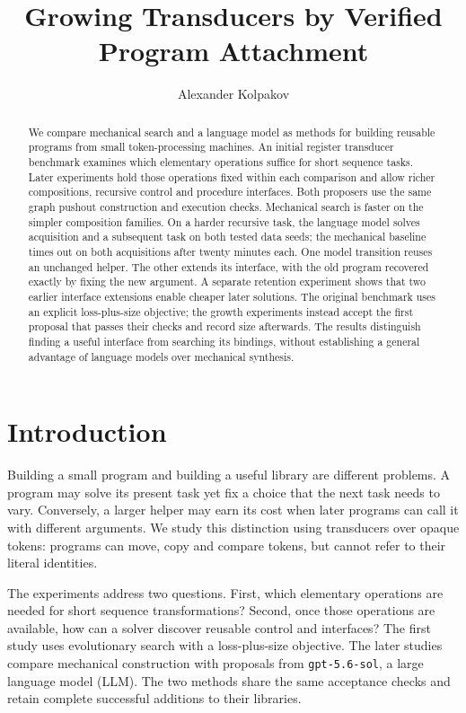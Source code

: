 \documentclass[11pt]{article}
\title{Growing Transducers by Verified Program Attachment}
\author{Alexander Kolpakov}
\date{}
\begin{document}
\maketitle

\begin{abstract}
We compare mechanical search and a language model as methods for building
reusable programs from small token-processing machines. An initial register
transducer benchmark examines which elementary operations suffice for short
sequence tasks. Later experiments hold those operations fixed within each
comparison and allow richer compositions, recursive control and procedure
interfaces. Both proposers use the same graph pushout construction and execution
checks. Mechanical search is faster on the simpler composition families. On a
harder recursive task, the language model solves acquisition and a subsequent
task on both tested data seeds; the mechanical baseline times out on both
acquisitions after twenty minutes each. One model transition reuses an unchanged
helper. The other extends its interface, with the old program recovered exactly
by fixing the new argument. A separate retention experiment shows that two
earlier interface extensions enable cheaper later solutions. The original
benchmark uses an explicit loss-plus-size objective; the growth experiments
instead accept the first proposal that passes their checks and record size
afterwards. The results distinguish finding a useful interface from searching
its bindings, without establishing a general advantage of language models over
mechanical synthesis.
\end{abstract}

\section{Introduction}

Building a small program and building a useful library are different problems.
A program may solve its present task yet fix a choice that the next task needs
to vary. Conversely, a larger helper may earn its cost when later programs can
call it with different arguments. We study this distinction using transducers
over opaque tokens: programs can move, copy and compare tokens, but cannot
refer to their literal identities.

The experiments address two questions. First, which elementary operations are
needed for short sequence transformations? Second, once those operations are
available, how can a solver discover reusable control and interfaces? The first
study uses evolutionary search with a loss-plus-size objective. The later
studies compare mechanical construction with proposals from
\texttt{gpt-5.6-sol}, a large language model (LLM). The two methods share the
same acceptance checks and retain complete successful additions to their
libraries.
\end{document}
